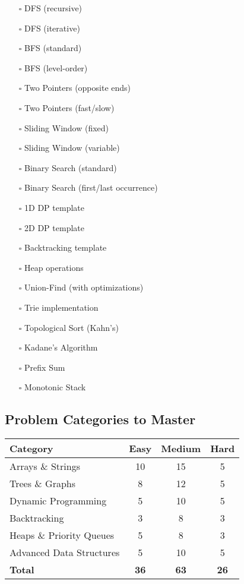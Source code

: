 \documentclass[10pt,a4paper]{article}
\begin{document}
\begin{itemize}
\item[$\square$] DFS (recursive)
\item[$\square$] DFS (iterative)
\item[$\square$] BFS (standard)
\item[$\square$] BFS (level-order)
\item[$\square$] Two Pointers (opposite ends)
\item[$\square$] Two Pointers (fast/slow)
\item[$\square$] Sliding Window (fixed)
\item[$\square$] Sliding Window (variable)
\item[$\square$] Binary Search (standard)
\item[$\square$] Binary Search (first/last occurrence)
\item[$\square$] 1D DP template
\item[$\square$] 2D DP template
\item[$\square$] Backtracking template
\item[$\square$] Heap operations
\item[$\square$] Union-Find (with optimizations)
\item[$\square$] Trie implementation
\item[$\square$] Topological Sort (Kahn's)
\item[$\square$] Kadane's Algorithm
\item[$\square$] Prefix Sum
\item[$\square$] Monotonic Stack
\end{itemize}

\subsection{Problem Categories to Master}
\begin{table}[h]
\centering
\begin{tabular}{|l|c|c|c|}
\hline
\textbf{Category} & \textbf{Easy} & \textbf{Medium} & \textbf{Hard} \\
\hline
Arrays \& Strings & 10 & 15 & 5 \\
\hline
Trees \& Graphs & 8 & 12 & 5 \\
\hline
Dynamic Programming & 5 & 10 & 5 \\
\hline
Backtracking & 3 & 8 & 3 \\
\hline
Heaps \& Priority Queues & 5 & 8 & 3 \\
\hline
Advanced Data Structures & 5 & 10 & 5 \\
\hline
\textbf{Total} & \textbf{36} & \textbf{63} & \textbf{26} \\
\hline
\end{tabular}
\end{table}
\end{document}
